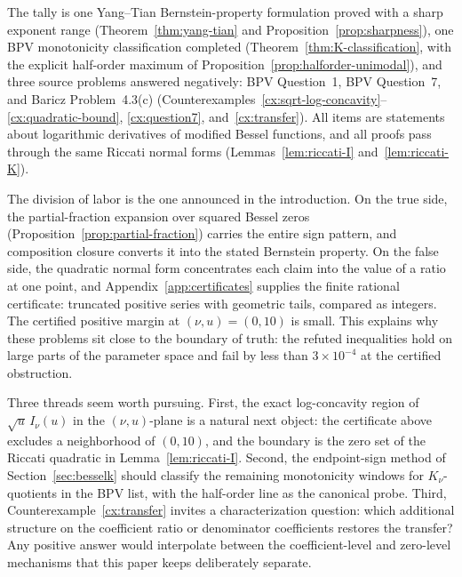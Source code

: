 \documentclass[preprint,12pt]{elsarticle}
\theoremstyle{plain}
\theoremstyle{definition}
\theoremstyle{remark}
\begin{document}
The tally is one Yang--Tian Bernstein-property formulation proved with a sharp
exponent range
(Theorem~\ref{thm:yang-tian} and Proposition~\ref{prop:sharpness}), one BPV
monotonicity classification completed (Theorem~\ref{thm:K-classification},
with the explicit half-order maximum of
Proposition~\ref{prop:halforder-unimodal}), and three source problems answered
negatively: BPV Question~1, BPV Question~7, and Baricz Problem~4.3(c)
(Counterexamples~\ref{cx:sqrt-log-concavity}--\ref{cx:quadratic-bound},
\ref{cx:question7}, and~\ref{cx:transfer}). All items are statements about
logarithmic derivatives of modified Bessel functions, and all proofs pass
through the same Riccati normal forms
(Lemmas~\ref{lem:riccati-I} and~\ref{lem:riccati-K}).

The division of labor is the one announced in the introduction. On the true
side, the partial-fraction expansion over squared Bessel zeros
(Proposition~\ref{prop:partial-fraction}) carries the entire sign pattern,
and composition closure converts it into the stated Bernstein property.
On the false side, the quadratic normal form concentrates each claim into
the value of a ratio at one point, and Appendix~\ref{app:certificates}
supplies the finite rational certificate: truncated positive series with
geometric tails, compared as integers. The certified positive margin at
\((\nu,u)=(0,10)\) is small. This explains why these problems sit close to
the boundary of truth: the refuted inequalities hold on large parts of the
parameter space and fail by less than \(3\times10^{-4}\) at the certified
obstruction.

Three threads seem worth pursuing. First, the exact log-concavity region of
\(\sqrt u\,I_\nu(u)\) in the \((\nu,u)\)-plane is a natural next object: the
certificate above excludes a neighborhood of \((0,10)\), and the boundary is
the zero set of the Riccati quadratic in Lemma~\ref{lem:riccati-I}. Second,
the endpoint-sign method of
Section~\ref{sec:besselk} should classify the remaining monotonicity windows
for \(K_\nu\)-quotients in the BPV list, with the half-order line as the
canonical probe. Third, Counterexample~\ref{cx:transfer} invites a
characterization question: which additional structure on the coefficient
ratio or denominator coefficients restores the transfer? Any positive answer
would interpolate between the coefficient-level and zero-level mechanisms
that this paper keeps deliberately separate.


\appendix
\renewcommand{\thetheorem}{\Alph{section}.\arabic{theorem}}
\end{document}
